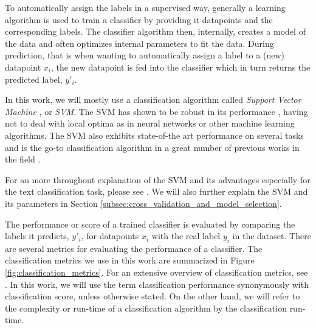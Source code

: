 To automatically assign the labels in a supervised way, generally a learning algorithm is used to train a classifier by providing it datapoints and the corresponding labels.
The classifier algorithm then, internally, creates a model of the data and often optimizes internal parameters to fit the data.
During prediction, that is when wanting to automatically assign a label to a (new) datapoint $x_i$, the new datapoint is fed into the classifier which in turn returns the predicted label, $y'_i$.

In this work, we will mostly use a classification algorithm called \textit{Support Vector Machine} \cite{Cortes1995}, or \textit{SVM}.
The SVM has shown to be robust in its performance \cite{Joachims1998}, having not to deal with local optima as in neural networks or other machine learning algorithms.
The SVM also exhibits state-of-the art performance on several tasks and is the go-to classification algorithm in a great number of previous works in the field \cite{Joachims1998, Vitale2012, Neuhaus2006a,Kriege2012, Koronacki2008}.

For an more throughout explanation of the SVM and its advantages especially for the text classification task, please see \cite{Joachims1998}.
We will also further explain the SVM and its parameters in Section \ref{subsec:cross_validation_and_model_selection}.

The performance or score of a trained classifier is evaluated by comparing the labels it predicts, $y'_i$,  for datapoints $x_i$ with the real label $y_i$ in the dataset.
There are several metrics for evaluating the performance of a classifier.
The classification metrics we use in this work are summarized in Figure \ref{fig:classification_metrics}.
For an extensive overview of classification metrics, see \cite{Forman2003}.
In this work, we will use the term classification performance synonymously with classification score, unless otherwise stated.
On the other hand, we will refer to the complexity or run-time of a classification algorithm by the classification run-time.

